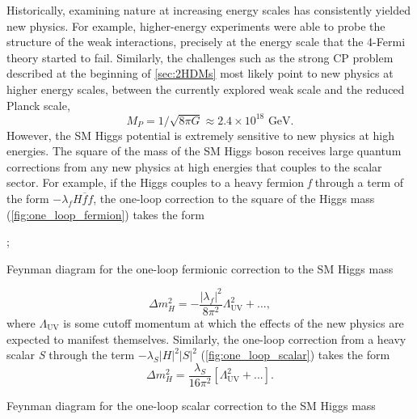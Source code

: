 Historically, examining nature at increasing energy scales has consistently yielded new physics. For example, higher-energy experiments were able to probe the structure of the weak interactions, precisely at the energy scale that the 4-Fermi theory started to fail. Similarly, the challenges such as the strong CP problem described at the beginning of \autoref{sec:2HDMs} most likely point to new physics at higher energy scales, between the currently explored weak scale and the reduced Planck scale,
\begin{equation*}
M_P = 1/\sqrt{8\pi G} \approx 2.4\times 10^{18} \text{ GeV}.
\end{equation*}
However, the SM Higgs potential is extremely sensitive to new physics at high energies. The square of the mass of the SM Higgs boson receives large quantum corrections from any new physics at high energies that couples to the scalar sector. For example, if the Higgs couples to a heavy fermion \emph{f} through a term of the form $-\lambda_fH\overline{f}f$, the one-loop correction to the square of the Higgs mass (\autoref{fig:one_loop_fermion}) takes the form
\begin{marginfigure}[2cm]
;
\caption{Feynman diagram for the one-loop fermionic correction to the SM Higgs mass}
\label{fig:one_loop_fermion}
\end{marginfigure}
\begin{equation}
\Delta m_H^2 = -\frac{|\lambda_f|^2}{8\pi^2}\Lambda_\text{UV}^2 + ...,
\label{eq:one_loop_fermion}
\end{equation}
\noindent where $\Lambda_\text{UV}$ is some cutoff momentum at which the effects of the new physics are expected to manifest themselves. Similarly, the one-loop correction from a heavy scalar \emph{S} through the term $-\lambda_S|H|^2|S|^2$ (\autoref{fig:one_loop_scalar}) takes the form
\begin{equation}
  \Delta m_H^2 = \frac{\lambda_S}{16\pi^2}\left[\Lambda_\text{UV}^2 + ...\right].
\label{eq:one_loop_scalar}
\end{equation}
\begin{marginfigure}[0.5cm]
\caption{Feynman diagram for the one-loop scalar correction to the SM Higgs mass}
\label{fig:one_loop_scalar}
\end{marginfigure}
